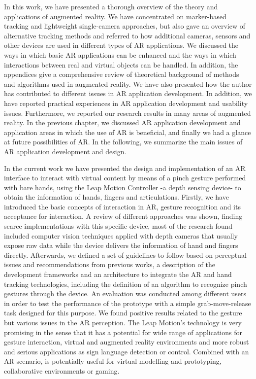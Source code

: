 


In this work, we have presented a thorough overview of the theory and applications of augmented reality. We have concentrated on marker-based tracking and lightweight single-camera approaches, but also gave an overview of alternative tracking methods and referred to how additional cameras, sensors and other devices are used in different types of AR applications. We discussed the ways in which basic AR applications can be enhanced and the ways in which interactions between real and virtual objects can be handled. In addition, the appendices give a comprehensive review of theoretical background of methods and algorithms used in augmented reality. We have also presented how the author has contributed to different issues in AR application development. In addition, we have reported practical experiences in AR application development and usability issues. Furthermore, we reported our research results in many areas of augmented reality. In the previous chapter, we discussed AR application development and application areas in which the use of AR is beneficial, and finally we had a glance at future possibilities of AR. In the following, we summarize the main issues of AR application development and design.

In the current work we have presented the design and implementation of an AR interface to interact with virtual content by means of a pinch gesture performed with bare hands, using the Leap Motion Controller -a depth sensing device- to obtain the information of hands, fingers and articulations. Firstly, we have introduced the basic concepts of interaction in AR, gesture recognition and its acceptance for interaction. A review of different approaches was shown, finding scarce implementations with this specific device, most of the research found included computer vision techniques applied with depth cameras that usually expose raw data while the device delivers the information of hand and fingers directly. Afterwards, we defined a set of guidelines to follow based on perceptual issues and recommendations from previous works, a description of the development frameworks and an architecture to integrate the AR and hand tracking technologies, including the definition of an algorithm to recognize pinch gestures through the device. An evaluation was conducted among different users in order to test the performance of the prototype with a simple grab-move-release task designed for this purpose. We found positive results related to the gesture but various issues in the AR perception. The Leap Motion’s technology is very promising in the sense that it has a potential for wide range of applications for gesture interaction, virtual and augmented reality environments and more robust and serious applications as sign language detection or control. Combined with an AR scenario, is potentially useful for virtual modelling and prototyping, collaborative environments or gaming.


